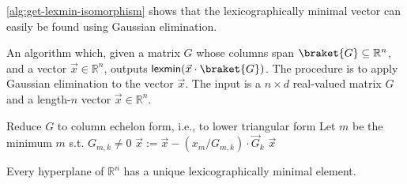 \autoref{alg:get-lexmin-isomorphism} shows that the lexicographically minimal vector can easily be found using Gaussian elimination.
\begin{algorithm}
	\caption{An algorithm which, given a matrix $G$ whose columns span $\braket{G}\subseteq \mathbb R^n$, and a vector $\vec x\in \mathbb R^n$, outputs $\textsf{lexmin}(\vec x\cdot \braket{G})$. The procedure is to apply Gaussian elimination to the vector $\vec x$. The input is a $n\times d$ real-valued matrix $G$ and a length-$n$ vector $\vec x\in \mathbb R^n$.}
	\label{alg:get-lexmin-isomorphism}
	\begin{algorithmic}[1]
		\State Reduce $G$ to column echelon form, i.e., to lower triangular form
			\State Let $m$ be the minimum $m$ s.t. $G_{m,k}\ne 0$
				\State $\vec x:=\vec x - (x_m/G_{m,k}) \cdot \vec G_k$
			\EndIf
		\EndFor
		\State \Return $\vec x$
		\EndProcedure
	\end{algorithmic}
\end{algorithm}
\begin{theorem}
	\label{thm:hyperplane-has-lexmin-element}
	Every hyperplane of $\mathbb R^n$ has a unique lexicographically minimal element.
\end{theorem}
